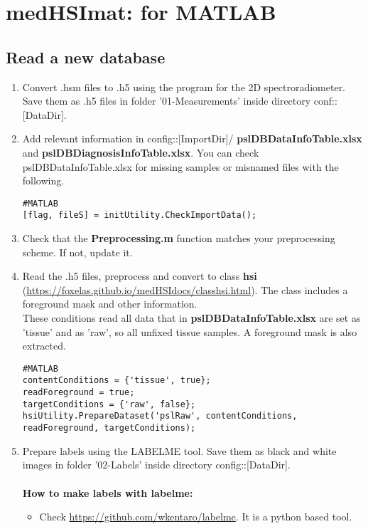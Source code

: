 \documentclass{foxelas_report}
\begin{document}
\section{medHSImat: for MATLAB}

\subsection{Read a new database}
\begin{enumerate}
\item Convert .hsm files to .h5 using the program for the 2D spectroradiometer. Save them as .h5 files in folder '01-Measurements' inside directory conf::[DataDir]. 


\item Add relevant information in config::[ImportDir]/ \textbf{pslDBDataInfoTable.xlsx} and \textbf{pslDBDiagnosisInfoTable.xlsx}. You can check pslDBDataInfoTable.xlsx for missing samples or misnamed files with the following. 
\begin{lstlisting}
#MATLAB
[flag, fileS] = initUtility.CheckImportData();
\end{lstlisting}

\item Check that the \textbf{Preprocessing.m} function matches your preprocessing scheme. If not, update it. 


\item Read the .h5 files, preprocess and convert to class \textbf{hsi} (\url{https://foxelas.github.io/medHSIdocs/classhsi.html}). The class includes a foreground mask and other information. \\

These conditions read all data that in \textbf{pslDBDataInfoTable.xlsx} are set as 'tissue' and as 'raw', so all unfixed tissue samples. A foreground mask is also extracted. 

\begin{lstlisting}
#MATLAB
contentConditions = {'tissue', true};
readForeground = true;
targetConditions = {'raw', false};
hsiUtility.PrepareDataset('pslRaw', contentConditions, readForeground, targetConditions);
\end{lstlisting}


\item Prepare labels using the LABELME tool. Save them as black and white images in folder '02-Labels' inside directory config::[DataDir]. \\
\\
\textbf{How to make labels with labelme: 
}\begin{itemize}
\item Check  \url{https://github.com/wkentaro/labelme}. It is a python based tool.


\end{itemize}
\end{enumerate}
\end{document}
